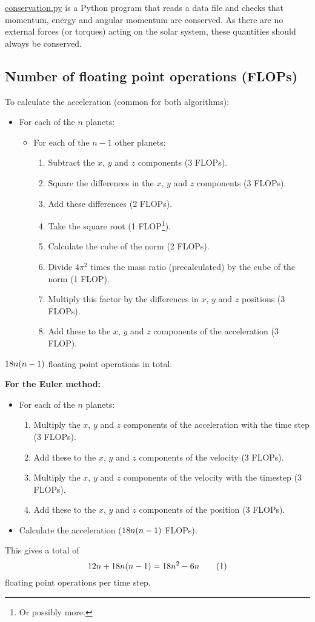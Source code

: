 \documentclass[12pt,english,a4paper]{report}
\newcommand{\eqtag}[1]{\refstepcounter{equation}\tag{\theequation}\label{#1}}
\newcommand{\program}[1]{\href{https://github.com/anjohan/Offentlig/blob/master/FYS3150/Oblig3/#1}{#1}}
\begin{document}
\program{conservation.py} is a Python program that reads a data file and checks that momentum, energy and angular momentum are conserved. As there are no external forces (or torques) acting on the solar system, these quantities should always be conserved.

\subsection{Number of floating point operations (FLOPs)}
\renewcommand{\theenumii}{\arabic{enumii}}
\renewcommand{\theenumiii}{\arabic{enumiii}}
To calculate the acceleration (common for both algorithms):
\begin{itemize}
\item For each of the \(n\) planets:
\begin{itemize}
\item For each of the \(n-1\) other planets:
\begin{enumerate}
\item Subtract the \(x\), \(y\) and \(z\) components (3 FLOPs).
\item Square the differences in the \(x\), \(y\) and \(z\) components (3 FLOPs).
\item Add these differences (2 FLOPs).
\item Take the square root (1 FLOP\footnote{Or possibly more.}).
\item Calculate the cube of the norm (2 FLOPs).
\item Divide \(4\pi^2\) times the mass ratio (precalculated) by the cube of the norm (1 FLOP).\label{factor}
\item Multiply this factor by the differences in \(x\), \(y\) and \(z\) positions (3 FLOPs).
\item Add these to the \(x\), \(y\) and \(z\) components of the acceleration (3 FLOP).
\end{enumerate}
\end{itemize}
\end{itemize}
\(18n\qty(n-1)\) floating point operations in total.

\textbf{For the Euler method:}
\begin{itemize}
\item For each of the \(n\) planets:
\begin{enumerate}
\item Multiply the \(x\), \(y\) and \(z\) components of the acceleration with the time step (3 FLOPs).
\item Add these to the \(x\), \(y\) and \(z\) components of the velocity (3 FLOPs).
\item Multiply the \(x\), \(y\) and \(z\) components of the velocity with the timestep (3 FLOPs).
\item Add these to the \(x\), \(y\) and \(z\) components of the position (3 FLOPs).
\end{enumerate}
\item Calculate the acceleration (\(18n\qty(n-1)\) FLOPs).
\end{itemize}
This gives a total of \[12n + 18n\qty(n-1) = 18n^2-6n\eqtag{eulerflops}\] floating point operations per time step.
\end{document}
